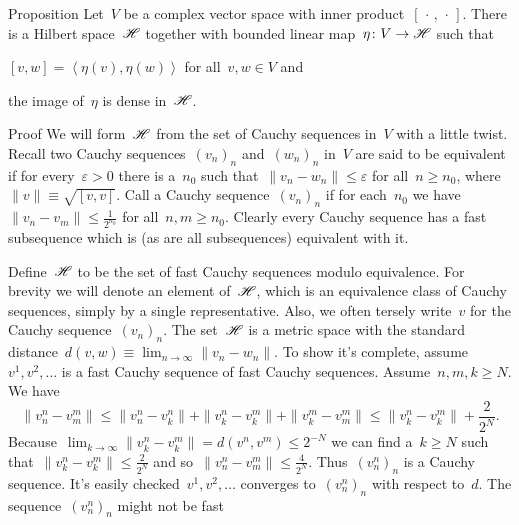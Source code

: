 \documentclass[b]{subfiles}
\begin{document}
\begin{parsec}
\begin{point}{Proposition}%
    Let~$V$ be a complex vector space with inner
        product~$[\,\cdot\,,\,\cdot\,]$.
    There is a Hilbert space~$\mathscr{H}$
        together with bounded linear map~$\eta\colon V \to \mathscr{H}$
            such that
        \begin{inparaenum}
        \item
        $[v,w] = \left<\eta(v), \eta(w)\right>$
            for all~$v,w \in V$ and
        \item
        the image of~$\eta$ is dense in~$\mathscr{H}$.
        \end{inparaenum}
\begin{point}{Proof}%
We will form~$\mathscr{H}$ from the set of Cauchy sequences in~$V$
    with a little twist.
Recall two Cauchy
    sequences~$(v_n)_n$ and~$(w_n)_n$ in~$V$
    are said to be equivalent
    if for every~$\varepsilon > 0$
    there is a~$n_0$
    such that~$\| v_n - w_n \| \leq \varepsilon$
    for all~$n \geq n_0$,
    where $\|v\| \equiv \sqrt{[v,v]}$.
Call a Cauchy sequence~$(v_n)_n$ 
    if for each~$n_0$
    we have~$\| v_n - v_m\| \leq \frac{1}{2^{n_0}}$
    for all~$n,m \geq n_0$.
Clearly every Cauchy sequence has a fast subsequence
    which is (as are all subsequences) equivalent with it.
\begin{point}%
    Define~$\mathscr{H}$ to be the set of fast Cauchy sequences modulo
        equivalence.
For brevity we will denote an element of~$\mathscr{H}$,
    which is an equivalence class of Cauchy sequences, simply by
    a single representative.
Also, we often tersely write~$v$ for the Cauchy sequence~$(v_n)_n$.
The set~$\mathscr{H}$ is a metric space with the standard
    distance~$d(v, w) \equiv \lim_{n\to\infty} \| v_n - w_n\|$.
To show it's complete, assume
$v^1, v^2, \ldots$
is a fast Cauchy sequence of fast Cauchy sequences.
Assume~$n,m,k \geq N$.  We have
\begin{equation*}
    \| v^n_n - v^m_m \|
        \leq
    \| v^n_n - v^n_k \| +
    \| v^n_k - v^m_k \| +
    \| v^m_k - v^m_m \| \leq
    \| v^n_k - v^m_k \|+ \frac{2}{2^N}.
\end{equation*}
Because~$\lim_{k\to\infty} \|v_k^n-v_k^m \| =d(v^n,v^m) \leq 2^{-N}$
    we can find a~$k \geq N$
    such that~$\| v^n_k - v^m_k \| \leq \frac{2}{2^N}$
    and so~$\|v^n_n - v^m_m\| \leq \frac{4}{2^N}$.
    Thus~$(v^n_n)_n$ is a Cauchy sequence.
It's easily checked~$v^1, v^2, \ldots$
converges to~$(v^n_n)_n$ with respect to~$d$.
The sequence~$(v^n_n)_n$ might not be fast

\end{point}
\end{point}
\end{point}
\end{parsec}
\end{document}
